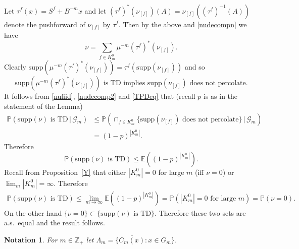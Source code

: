 \documentclass[12pt]{article}
\makeatletter
\renewenvironment{proof}[1][\proofname]{%
\par\pushQED{\qed}\normalfont%
\topsep6\p@\@plus6\p@\relax
\trivlist\item[\hskip\labelsep\bfseries#1\@addpunct{.}]%
\ignorespaces
}{%
\popQED\endtrivlist\@endpefalse
}
\numberwithin{theorem}{section}
\newtheorem{remark}[theorem]{Remark}
\theoremstyle{def}
\newtheorem*{notation}{Notation}
\numberwithin{equation}{section}
\renewcommand{\P}{\mathbb{P}}
\newcommand{\E}{\mathbb{E}}
\newcommand{\Z}{\mathbb{Z}}
\newcommand{\N}{\mathbb{N}}
\newcommand{\cG}{\mathcal G}
\newcommand{\supp}{\mathrm{supp}}
\makeatother
\begin{document}
\begin{proof}[Proof of Lemma~\ref{lem:01}]
\begin{align*}
\end{align*}
Let $\tau^f(x)=S^f+B^{-m}x$ and let $(\tau^f)^*(\nu_{[f]})(A)=\nu_{[f]}((\tau^f)^{-1}(A))$ denote the pushforward of $\nu_{[f]}$ by $\tau^f$. Then by the above and \eqref{nudecompn} we have
\begin{equation}\label{nudecomp2}
\nu=\sum_{f\in K^0_m}\mu^{-m}(\tau^f)^*(\nu_{[f]}).
\end{equation}
Clearly $\supp(\mu^{-m}(\tau^f)^*(\nu_{[f]}))=\tau^f(\supp(\nu_{[f]}))$ and so 
\begin{equation}\label{TPDeq}\supp(\mu^{-m}(\tau^f)^*(\nu_{[f]}))\text{ is TD implies }\supp(\nu_{[f]})\text{ does not percolate}.
\end{equation}
It follows from \eqref{nufiid}, \eqref{nudecomp2} and \eqref{TPDeq} that (recall $p$ is as in the statement of the Lemma)
\begin{align}\label{TDub}
\nonumber\P(\supp(\nu)\text{ is TD} \, | \, \cG_m)&\le \P(\cap_{f\in K^0_m}\{\supp(\nu_{[f]}) \text{ does not percolate}\} \, | \, \cG_m)\\
&=(1-p)^{|K^0_m|}.
\end{align}
Therefore 
\[\P(\supp(\nu)\text{ is TD})\le \E((1-p)^{|K^0_m|}).\]
Recall from Proposition~\ref{Y} that either $|K^0_m|=0$ for large $m$ (iff $\nu=0$) or $\lim_m|K^0_m|=\infty$. Therefore
\begin{align*}
\P(\supp(\nu)\text{ is TD})\le \lim_{m\to\infty}\E((1-p)^{|K^0_m|})=\P(|K^0_m|=0\text{ for large }m)=\P(\nu=0).
\end{align*}
On the other hand $\{\nu=0\}\subset \{\supp(\nu)\text{ is TD}\}$. Therefore these two sets are a.s.\ equal and the result follows. 
\end{proof}
\begin{notation} For $m\in\Z_+$ let $\Lambda_m=\{\overline{C_m(x)}:x\in G_m\}$.
\end{notation}
\end{document}
